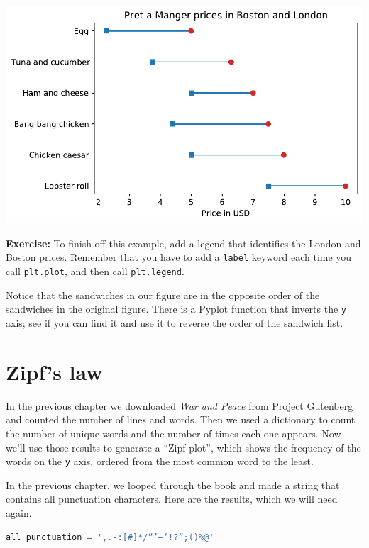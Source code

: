 \begin{center}
\includegraphics[scale=0.75]{chapters/06_plotting_files/06_plotting_48_0.pdf}
\end{center}

\textbf{Exercise:} To finish off this example, add a legend that
identifies the London and Boston prices. Remember that you have to add a
\passthrough{\lstinline!label!} keyword each time you call
\passthrough{\lstinline!plt.plot!}, and then call
\passthrough{\lstinline!plt.legend!}.

Notice that the sandwiches in our figure are in the opposite order of
the sandwiches in the original figure. There is a Pyplot function that
inverts the \passthrough{\lstinline!y!} axis; see if you can find it and
use it to reverse the order of the sandwich list.

\hypertarget{zipfs-law}{%
\section{Zipf's law}\label{zipfs-law}}

In the previous chapter we downloaded \emph{War and Peace} from Project
Gutenberg and counted the number of lines and words. Then we used a
dictionary to count the number of unique words and the number of times
each one appears. Now we'll use those results to generate a ``Zipf
plot'', which shows the frequency of the words on the
\passthrough{\lstinline!y!} axis, ordered from the most common word to
the least.

In the previous chapter, we looped through the book and made a string
that contains all punctuation characters. Here are the results, which we
will need again.

\begin{lstlisting}[language=Python]
all_punctuation = ',.-:[#]*/“’—‘!?”;()%@'
\end{lstlisting}

